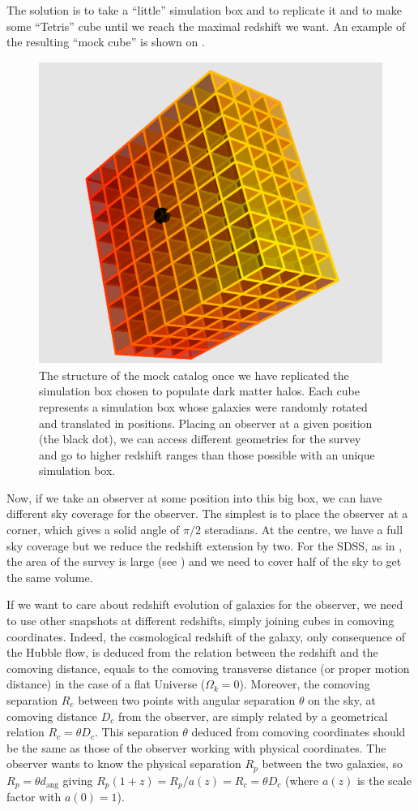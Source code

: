 The solution is to take a ``little'' simulation box and to replicate it and to
make some ``Tetris'' cube until we reach the maximal redshift we want. An
example of the resulting ``mock cube'' is shown on .
%
\begin{figure}[htb]
    \centering
    \includegraphics[width=0.4\linewidth]{figures/mock/mock}
    \caption{The structure of the mock catalog once we have replicated the
        simulation box chosen to populate dark matter halos. Each cube
        represents a simulation box whose galaxies were randomly rotated and
        translated in positions. Placing an observer at a given position (the
    black dot), we can access different geometries for the survey and go to
higher redshift ranges than those possible with an unique simulation
box.\label{fig:cubemock}}%
\end{figure}

Now, if we take an observer at some position into this big box, we can have
different sky coverage for the observer. The simplest is to place the observer
at a corner, which gives a solid angle of $\pi/2$ steradians. At the centre,
we have a full sky coverage but we reduce the redshift extension by two. For
the SDSS, as in , the area of the survey is large (see
) and we need to cover half of the sky to get the same
volume.

If we want to care about redshift evolution of galaxies for the observer, we
need to use other snapshots at different redshifts, simply joining cubes in
comoving coordinates. Indeed, the cosmological redshift of the galaxy, only
consequence of the Hubble flow, is deduced from the relation between the
redshift and the comoving distance, equals to the comoving transverse distance
(or proper motion distance) in the case of a flat Universe ($\Omega_k=0$).
Moreover, the comoving separation $R_c$ between two points with angular
separation $\theta$ on the sky, at comoving distance $D_c$ from the observer,
are simply related by a geometrical relation $R_c=\theta D_c$. This separation
$\theta$ deduced from comoving coordinates should be the same as those of the
observer working with physical coordinates. The observer wants to know the
physical separation $R_p$ between the two galaxies, so $R_p=\theta
d_\mathrm{ang}$ giving $R_p \left(1+z\right)= R_p/a\left(z\right)=R_c=\theta
D_c$ (where $a \left(z\right)$ is the scale factor with $a \left(0\right)=1$).

